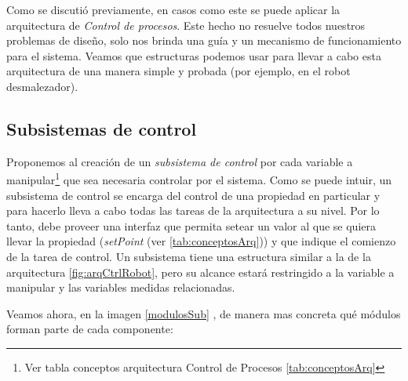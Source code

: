 Como se discutió previamente, en casos como este se puede aplicar la arquitectura de \textit{Control de procesos}. Este hecho no resuelve todos nuestros problemas de diseño, solo nos brinda una guía y un mecanismo de funcionamiento para el sistema. Veamos que estructuras podemos usar para llevar a cabo esta arquitectura de una manera simple y probada (por ejemplo, en el robot desmalezador).

\subsection{Subsistemas de control}

Proponemos al creación de un \textit{subsistema de control} por cada variable a manipular\footnote{Ver tabla conceptos arquitectura Control de Procesos \ref{tab:conceptosArq}} que sea necesaria controlar por el sistema. Como se puede intuir, un subsistema de control se encarga del control de una propiedad en particular y para hacerlo lleva a cabo todas las tareas de la arquitectura a su nivel. Por lo tanto, debe proveer una interfaz que permita setear un valor al que se quiera llevar la propiedad (\textit{setPoint} (ver  \ref{tab:conceptosArq})) y que indique el comienzo de la tarea de control. Un subsistema tiene una estructura similar a la de la arquitectura \ref{fig:arqCtrlRobot}, pero su alcance estará restringido a la variable a manipular y las variables medidas relacionadas.


Veamos ahora, en la imagen \ref{modulosSub} , de manera mas concreta qué módulos forman parte de cada componente:


